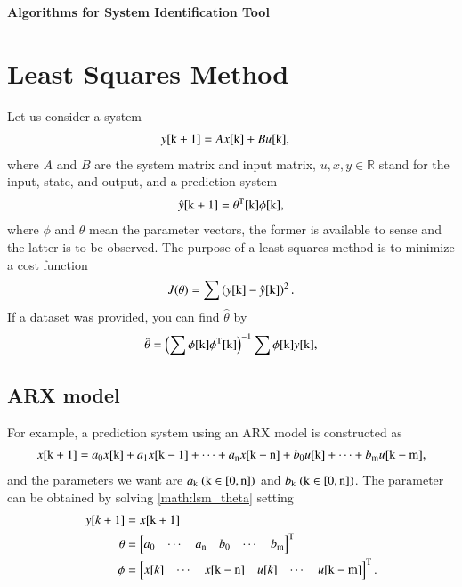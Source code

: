 \documentclass[10pt]{article}
\begin{document}
\begin{center}
	\textbf
	{
		\huge{Algorithms for System Identification Tool}\\
	}
 	\vspace{5mm}

\end{center}

\section{Least Squares Method}
Let us consider a system
\begin{align}
y[{\rm k}+1] &= Ax[{\rm k}] + Bu[{\rm k}],
\end{align}
where $A$ and $B$ are the system matrix and input matrix, $u, x, y\in\mathbb{R}$ stand for the input, state, and output, and a prediction system
\begin{align}
\hat{y}[{\rm k}+1] = \theta^{\mathrm T}[{\rm k}]\phi[{\rm k}],
\end{align}
where $\phi$ and $\theta$ mean the parameter vectors, the former is available to sense  and the latter is to be observed.
The purpose of a least squares method is to minimize a cost function
\begin{align}
J(\theta) = \sum \left(y[{\rm k}] - \hat{y}[{\rm k}]\right)^2.	\label{math:lsm_theta}
\end{align}
If a dataset was provided, you can find $\hat{\theta}$ by
\begin{align}
\hat{\theta} =\left(\sum \phi[{\rm k}]\phi^{\mathrm T}[{\rm k}]\right)^{-1}\sum \phi[{\rm k}] y[{\rm k}],
\end{align}

\subsection{ARX model} 
For example, a prediction system using an ARX model is constructed as
\begin{align}
x[{\rm k}+1] = a_0x[{\rm k}] + a_1x[{\rm k}-1] + \cdots + a_{\rm n}x[{\rm k-n}] + b_0u[{\rm k}] + \cdots + b_{\rm m}u[{\rm k-m}],
\end{align}
and the parameters we want are $a_{\rm k}\ ({\rm k}\in[0, {\rm n}])$ and $b_{\rm k}\ ({\rm k}\in[0, {\rm n}])$.
The parameter can be obtained by solving \eqref{math:lsm_theta} setting
\begin{align}
y[k+1] &= x[{\rm k}+1]\\
\theta&=\begin{bmatrix}a_0 & \cdots & a_{\rm n} & b_{0} & \cdots & b_{\rm m}\end{bmatrix}^{\rm T}\\
\phi&=\begin{bmatrix}x[k] & \cdots & x[{\rm k-n}] & u[k] & \cdots & u[{\rm k-m}]\end{bmatrix}^{\rm T}.
\end{align}
\end{document}
